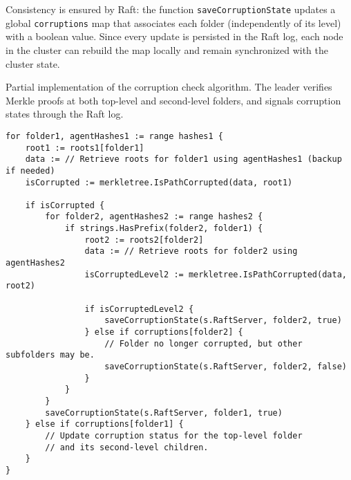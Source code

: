 Consistency is ensured by Raft: the function \texttt{saveCorruptionState} updates
a global \texttt{corruptions} map that associates each folder (independently of
its level) with a boolean value. Since every update is persisted in the Raft
log, each node in the cluster can rebuild the map locally and remain synchronized
with the cluster state.

\begin{listing}[H]
\caption{Partial implementation of the corruption check algorithm. The leader
verifies Merkle proofs at both top-level and second-level folders, and signals corruption states through the Raft log.}
\label{code:check-corruption-algorithm}
\begin{verbatim}
for folder1, agentHashes1 := range hashes1 {
    root1 := roots1[folder1]
    data := // Retrieve roots for folder1 using agentHashes1 (backup if needed)
    isCorrupted := merkletree.IsPathCorrupted(data, root1)

    if isCorrupted {
        for folder2, agentHashes2 := range hashes2 {
            if strings.HasPrefix(folder2, folder1) {
                root2 := roots2[folder2]
                data := // Retrieve roots for folder2 using agentHashes2
                isCorruptedLevel2 := merkletree.IsPathCorrupted(data, root2)

                if isCorruptedLevel2 {
                    saveCorruptionState(s.RaftServer, folder2, true)
                } else if corruptions[folder2] {
                    // Folder no longer corrupted, but other subfolders may be.
                    saveCorruptionState(s.RaftServer, folder2, false)
                }
            }
        }
        saveCorruptionState(s.RaftServer, folder1, true)
    } else if corruptions[folder1] {
        // Update corruption status for the top-level folder
        // and its second-level children.
    }
}
\end{verbatim}
\end{listing}
